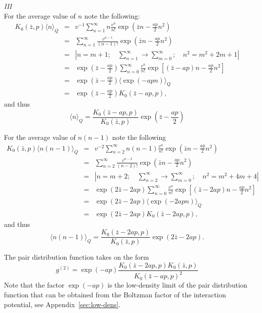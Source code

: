 {\it III} \\
For the average value of $n$ note the following:
\begin{eqnarray*}
	K_0(\bar{z}, p) \langle n \rangle_Q & = & 
	v^{-1} \sum_{n=1}^{\infty} n \frac{v^n}{n!} \exp(\bar{z}n - \frac{ap}{2}n^2)
	\\
	& = & \sum_{n=1}^{\infty} \frac{v^{n-1}}{(n-1)!} \exp(\bar{z}n - \frac{ap}{2}n^2)
	\\
	& = & \left| n=m+1; \quad \sum_{n=1}^{\infty} \rightarrow \sum_{m=0}^{\infty}; \quad n^2 = m^2 + 2m + 1 \right|
	\\
	& = & \exp(\bar{z} - \frac{ap}{2}) \sum_{n=0}^{\infty} \frac{v^n}{n!} \exp\left[(\bar{z} - ap)n - \frac{ap}{2}n^2 \right]
	\\
	& = & \exp(\bar{z} - \frac{ap}{2}) \langle \exp(-apn) \rangle_Q
	\\
	& = & \exp(\bar{z} - \frac{ap}{2}) K_0 (\bar{z} - ap, p),
\end{eqnarray*}
and thus
\begin{equation*}
	\langle n \rangle_Q = \frac{K_0(\bar{z} - ap, p)}{K_0(\bar{z}, p)} \exp(\bar{z} - \frac{ap}{2})
\end{equation*}

For the average value of $n(n-1)$ note the following
\begin{eqnarray*}
	K_0(\bar{z}, p) \langle n(n-1) \rangle_Q & = & 
	v^{-2} \sum_{n=2}^{\infty} n(n-1) \frac{v^n}{n!} \exp(\bar{z}n - \frac{ap}{2}n^2)
	\\
	& = & \sum_{n=2}^{\infty} \frac{v^{n-2}}{(n-2)!} \exp(\bar{z}n - \frac{ap}{2}n^2)
	\\
	& = & \left| n=m+2; \quad \sum_{n=2}^{\infty} \rightarrow \sum_{m=0}^{\infty}; \quad n^2 = m^2 + 4m +4 \right|
	\\
	& = & \exp(2\bar{z} - 2ap) \sum_{n=0}^{\infty} \frac{v^n}{n!} \exp\left[(\bar{z} - 2ap)n - \frac{ap}{2}n^2 \right]
	\\
	& = & \exp(2\bar{z} - 2ap) \langle \exp(-2apn) \rangle_Q
	\\
	& = & \exp(2\bar{z} - 2ap) K_0(\bar{z} - 2ap, p),
\end{eqnarray*}
and thus
\begin{equation*}
	\langle n(n-1) \rangle_Q = \frac{K_0(\bar{z} - 2ap, p)}{K_0(\bar{z}, p)} \exp(2\bar{z} - 2ap).
\end{equation*}

The pair distribution function takes on the form
\begin{equation}
	g^{(2)} = \exp(-ap) \frac{K_0(\bar{z} - 2ap, p) K_0(\bar{z}, p)}{K_0(\bar{z}-ap, p)^2}
\end{equation}
Note that the factor $\exp(-ap)$ is the low-density limit of the pair distribution function that can be obtained from the Boltzman factor of the interaction potential, see Appendix~\ref{sec:low-dens}.

